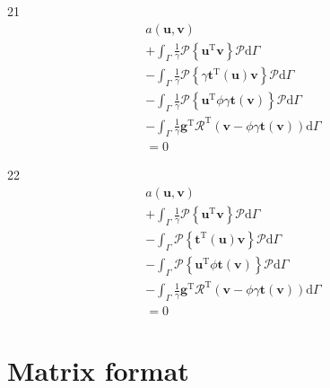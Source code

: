\documentclass[a4paper,12pt]{article}
\begin{document}
21
\begin{equation}
\begin{split}
a(\mathbf{u},\mathbf{v})
\\+
\int_\Gamma
\frac{1}{\gamma}
\mathcal{P}
\left\{
\mathbf{u}^\textrm{T}
\mathbf{v}
\right\}
\mathcal{P}
\textrm{d}\Gamma
\\-
\int_\Gamma
\frac{1}{\gamma}
\mathcal{P}
\left\{
\gamma\mathbf{t}^\textrm{T}(\mathbf{u})
\mathbf{v}
\right\}
\mathcal{P}
\textrm{d}\Gamma
\\-
\int_\Gamma
\frac{1}{\gamma}
\mathcal{P}
\left\{
\mathbf{u}^\textrm{T}
\phi\gamma\mathbf{t}(\mathbf{v})
\right\}
\mathcal{P}
\textrm{d}\Gamma
\\-
\int_\Gamma
\frac{1}{\gamma}
\mathbf{g}^\textrm{T}\mathcal{R}^\textrm{T}
(\mathbf{v}-\phi\gamma\mathbf{t}(\mathbf{v}))
\textrm{d}\Gamma
\\=
0
\end{split}
\end{equation}

22
\begin{equation}
\begin{split}
a(\mathbf{u},\mathbf{v})
\\+
\int_\Gamma
\frac{1}{\gamma}
\mathcal{P}
\left\{
\mathbf{u}^\textrm{T}
\mathbf{v}
\right\}
\mathcal{P}
\textrm{d}\Gamma
\\-
\int_\Gamma
\mathcal{P}
\left\{
\mathbf{t}^\textrm{T}(\mathbf{u})
\mathbf{v}
\right\}
\mathcal{P}
\textrm{d}\Gamma
\\-
\int_\Gamma
\mathcal{P}
\left\{
\mathbf{u}^\textrm{T}
\phi\mathbf{t}(\mathbf{v})
\right\}
\mathcal{P}
\textrm{d}\Gamma
\\-
\int_\Gamma
\frac{1}{\gamma}
\mathbf{g}^\textrm{T}\mathcal{R}^\textrm{T}
(\mathbf{v}-\phi\gamma\mathbf{t}(\mathbf{v}))
\textrm{d}\Gamma
\\=
0
\end{split}
\end{equation}

\section{Matrix format}
\end{document}
